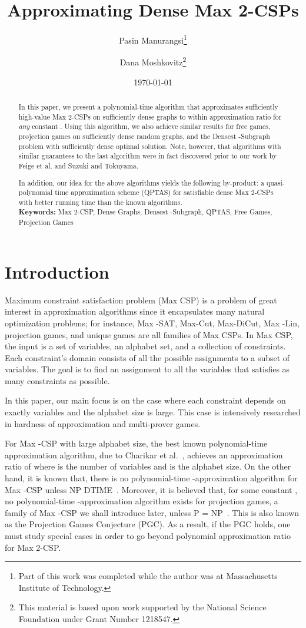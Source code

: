 \documentclass{article}
\title{Approximating Dense Max 2-CSPs}
\date{\today}
\author[1]{Pasin Manurangsi\thanks{Part of this work was completed while the author was at Massachusetts Institute of Technology.}}
\author[2]{Dana Moshkovitz\thanks{This material is based upon work supported by the National Science Foundation under Grant Number 1218547.}}
\affil[1]{Dropbox, Inc.\\
  San Francisco, CA 94107, USA\\
  \texttt{pasin@dropbox.com}}
\affil[2]{Massachusetts Institute of Technology \\
  Cambridge, MA 02139, USA\\
  \texttt{dmoshkov@mit.edu}}
\begin{document}
\maketitle


\begin{abstract}
In this paper, we present a polynomial-time algorithm that approximates sufficiently high-value {\sc Max 2-CSP}s on sufficiently dense graphs to within  approximation ratio for \emph{any} constant . Using this algorithm, we also achieve similar results for free games, projection games on sufficiently dense random graphs, and the {\sc Densest -Subgraph} problem with sufficiently dense optimal solution. Note, however, that algorithms with similar guarantees to the last algorithm were in fact discovered prior to our work by Feige et al. and Suzuki and Tokuyama.

In addition, our idea for the above algorithms yields the following by-product: a quasi-polynomial time approximation scheme (QPTAS) for satisfiable dense {\sc Max 2-CSP}s with better running time than the known algorithms. \\

{\bf Keywords:} {\sc Max 2-CSP}, Dense Graphs, {\sc Densest -Subgraph}, QPTAS, Free Games, Projection Games
\end{abstract}

\section{Introduction}

Maximum constraint satisfaction problem ({\sc Max CSP}) is a problem of great interest in approximation algorithms since it encapsulates many natural optimization problems; for instance, {\sc Max -SAT}, {\sc Max-Cut}, {\sc Max-DiCut}, {\sc Max -Lin}, projection games, and unique games are all families of {\sc Max CSP}s. In {\sc Max CSP}, the input is a set of variables, an alphabet set, and a collection of constraints. Each constraint's domain consists of all the possible assignments to a subset of variables. The goal is to find an assignment to all the variables that satisfies as many constraints as possible.

In this paper, our main focus is on the case where each constraint depends on exactly  variables and the alphabet size is large. This case is intensively researched in hardness of approximation and multi-prover games.

For Max -CSP with large alphabet size, the best known polynomial-time approximation algorithm, due to Charikar et al.~\cite{CHK}, achieves an approximation ratio of  where  is the number of variables and  is the alphabet size. On the other hand, it is known that, there is no polynomial-time -approximation algorithm for {\sc Max -CSP} unless NP  DTIME~\cite{Raz}. Moreover, it is believed that, for some constant , no polynomial-time -approximation algorithm exists for projection games, a family of {\sc Max -CSP} we shall introduce later, unless P = NP~\cite{M}. This is also known as the Projection Games Conjecture (PGC). As a result, if the PGC holds, one must study special cases in order to go beyond polynomial approximation ratio for {\sc Max 2-CSP}.
\end{document}
